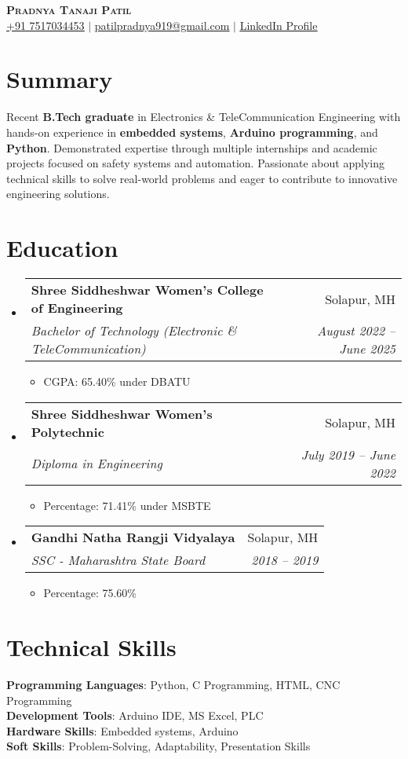 \documentclass[letterpaper,11pt]{article}
\makeatletter
\newcommand{\resumeItem}[1]{
  \item\small{
    {#1 \vspace{2pt}}
  }
}
\newcommand{\resumeSubheading}[4]{
  \vspace{1pt}\item
    \begin{tabular*}{0.97\textwidth}[t]{l@{\extracolsep{\fill}}r}
      \textbf{#1} & #2 \\
      \textit{\large#3} & \textit{\large #4} \\
    \end{tabular*}\vspace{-7pt}
}
\newcommand{\resumeSubHeadingListStart}{\begin{itemize}[leftmargin=0.15in, label={}]}
\newcommand{\resumeSubHeadingListEnd}{\end{itemize}}
\newcommand{\resumeItemListStart}{\begin{itemize}}
\newcommand{\resumeItemListEnd}{\end{itemize}\vspace{-2pt}}
\makeatother
\begin{document}
\begin{center}
    \textbf{\Huge \scshape Pradnya Tanaji Patil} \\ \vspace{1pt}
    \large \href{tel:+917517034453}{\underline{+91 7517034453}} $|$ \href{mailto:patilpradnya919@gmail.com}{\underline{patilpradnya919@gmail.com}} $|$ 
    \href{https://www.linkedin.com/in/pradnya-patil-643b6427a}{\underline{LinkedIn Profile}}
\end{center}


\section{Summary}
    Recent \textbf{B.Tech graduate} in Electronics \& TeleCommunication Engineering with hands-on experience in \textbf{embedded systems}, \textbf{Arduino programming}, and \textbf{Python}. Demonstrated expertise through multiple internships and academic projects focused on safety systems and automation. Passionate about applying technical skills to solve real-world problems and eager to contribute to innovative engineering solutions.


\section{Education}
  \resumeSubHeadingListStart
    \resumeSubheading
      {Shree Siddheshwar Women's College of Engineering}{Solapur, MH}
      {Bachelor of Technology (Electronic \& TeleCommunication)}{August 2022 -- June 2025}
      \resumeItemListStart
        \resumeItem{CGPA: 65.40\% under DBATU}
      \resumeItemListEnd
    \resumeSubheading
      {Shree Siddheshwar Women's Polytechnic}{Solapur, MH}
      {Diploma in Engineering}{July 2019 -- June 2022}
      \resumeItemListStart
        \resumeItem{Percentage: 71.41\% under MSBTE}
      \resumeItemListEnd
    \resumeSubheading
      {Gandhi Natha Rangji Vidyalaya}{Solapur, MH}
      {SSC - Maharashtra State Board}{2018 -- 2019}
      \resumeItemListStart
        \resumeItem{Percentage: 75.60\%}
      \resumeItemListEnd
  \resumeSubHeadingListEnd


%
\section{Technical Skills}
 \begin{itemize}[leftmargin=0.15in, label={}]
    \large{\item{
     \textbf{Programming Languages}{: Python, C Programming, HTML, CNC Programming} \\
     \textbf{Development Tools}{: Arduino IDE, MS Excel, PLC} \\
     \textbf{Hardware Skills}{: Embedded systems, Arduino} \\
     \textbf{Soft Skills}{: Problem-Solving, Adaptability, Presentation Skills}
    }}
 \end{itemize}
 
\end{document}
